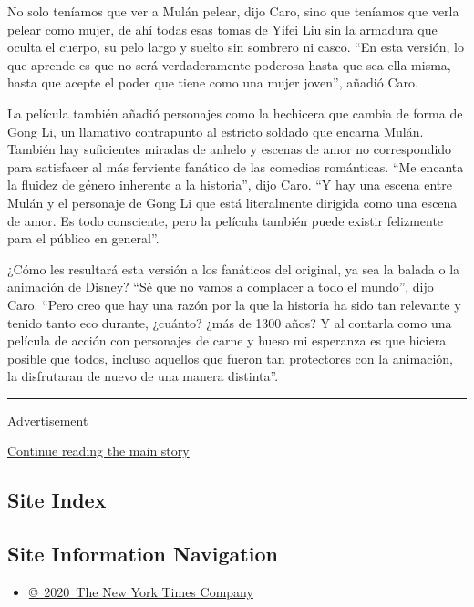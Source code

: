 No solo teníamos que ver a Mulán pelear, dijo Caro, sino que teníamos
que verla pelear como mujer, de ahí todas esas tomas de Yifei Liu sin la
armadura que oculta el cuerpo, su pelo largo y suelto sin sombrero ni
casco. ``En esta versión, lo que aprende es que no será verdaderamente
poderosa hasta que sea ella misma, hasta que acepte el poder que tiene
como una mujer joven'', añadió Caro.

La película también añadió personajes como la hechicera que cambia de
forma de Gong Li, un llamativo contrapunto al estricto soldado que
encarna Mulán. También hay suficientes miradas de anhelo y escenas de
amor no correspondido para satisfacer al más ferviente fanático de las
comedias románticas. ``Me encanta la fluidez de género inherente a la
historia'', dijo Caro. ``Y hay una escena entre Mulán y el personaje de
Gong Li que está literalmente dirigida como una escena de amor. Es todo
consciente, pero la película también puede existir felizmente para el
público en general''.

¿Cómo les resultará esta versión a los fanáticos del original, ya sea la
balada o la animación de Disney? ``Sé que no vamos a complacer a todo el
mundo'', dijo Caro. ``Pero creo que hay una razón por la que la historia
ha sido tan relevante y tenido tanto eco durante, ¿cuánto? ¿más de 1300
años? Y al contarla como una película de acción con personajes de carne
y hueso mi esperanza es que hiciera posible que todos, incluso aquellos
que fueron tan protectores con la animación, la disfrutaran de nuevo de
una manera distinta''.

\begin{center}\rule{0.5\linewidth}{\linethickness}\end{center}

Advertisement

\protect\hyperlink{after-bottom}{Continue reading the main story}

\hypertarget{site-index}{%
\subsection{Site Index}\label{site-index}}

\hypertarget{site-information-navigation}{%
\subsection{Site Information
Navigation}\label{site-information-navigation}}

\begin{itemize}
\tightlist
\item
  \href{https://help.nytimes3xbfgragh.onion/hc/en-us/articles/115014792127-Copyright-notice}{©~2020~The
  New York Times Company}
\end{itemize}

